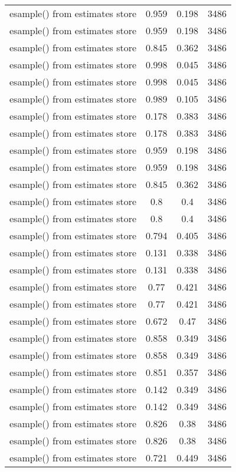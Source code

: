 \begin{table}[htbp]
\begin{tabular}{l c c  c}
esample() from estimates store & 0.959 & 0.198  & 3486\\
esample() from estimates store & 0.959 & 0.198  & 3486\\
esample() from estimates store & 0.845 & 0.362  & 3486\\
esample() from estimates store & 0.998 & 0.045  & 3486\\
esample() from estimates store & 0.998 & 0.045  & 3486\\
esample() from estimates store & 0.989 & 0.105  & 3486\\
esample() from estimates store & 0.178 & 0.383  & 3486\\
esample() from estimates store & 0.178 & 0.383  & 3486\\
esample() from estimates store & 0.959 & 0.198  & 3486\\
esample() from estimates store & 0.959 & 0.198  & 3486\\
esample() from estimates store & 0.845 & 0.362  & 3486\\
esample() from estimates store & 0.8 & 0.4  & 3486\\
esample() from estimates store & 0.8 & 0.4  & 3486\\
esample() from estimates store & 0.794 & 0.405  & 3486\\
esample() from estimates store & 0.131 & 0.338  & 3486\\
esample() from estimates store & 0.131 & 0.338  & 3486\\
esample() from estimates store & 0.77 & 0.421  & 3486\\
esample() from estimates store & 0.77 & 0.421  & 3486\\
esample() from estimates store & 0.672 & 0.47  & 3486\\
esample() from estimates store & 0.858 & 0.349  & 3486\\
esample() from estimates store & 0.858 & 0.349  & 3486\\
esample() from estimates store & 0.851 & 0.357  & 3486\\
esample() from estimates store & 0.142 & 0.349  & 3486\\
esample() from estimates store & 0.142 & 0.349  & 3486\\
esample() from estimates store & 0.826 & 0.38  & 3486\\
esample() from estimates store & 0.826 & 0.38  & 3486\\
esample() from estimates store & 0.721 & 0.449  & 3486\\

\end{tabular}
\end{table}

